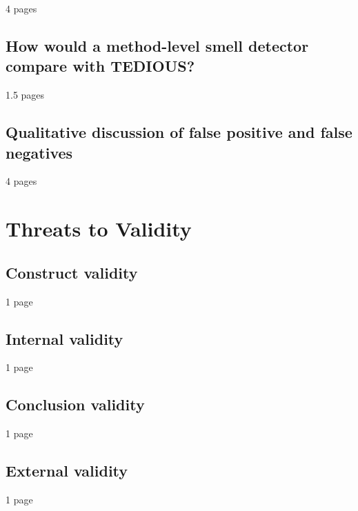 4 pages

\subsection{How would a method-level smell detector compare with TEDIOUS?}

1.5 pages

\subsection{Qualitative discussion of false positive and false negatives}

4 pages

\section{Threats to Validity}

\subsection{Construct validity}

1 page

\subsection{Internal validity}

1 page

\subsection{Conclusion validity}

1 page

\subsection{External validity}

1 page

